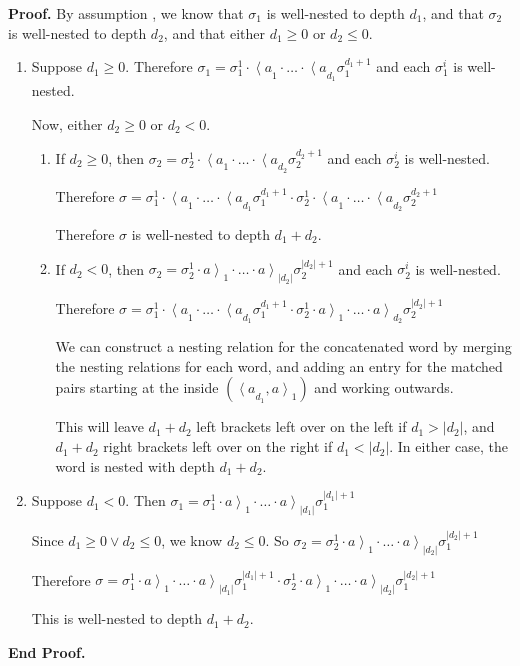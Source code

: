 \documentclass{article}
\newcommand{\lft}[1]{\left<{#1}\right.}
\newcommand{\rgt}[1]{\left.{#1}\right>}
\newenvironment{proof}{\noindent\textbf{Proof.}}
{\noindent\textbf{End Proof.}}
\begin{document}
\begin{proof}
By assumption , we know that $\sigma_1$ is well-nested to depth $d_1$, and that $\sigma_2$ is well-nested to depth $d_2$, and that either $d_1 \geq 0$ or $d_2 \leq 0$. 

  \begin{enumerate}
    \item Suppose $d_1 \geq 0$. Therefore $\sigma_1 = \sigma^1_1\cdot\lft{a}_1\cdot \ldots\cdot\lft{a}_{d_1}\sigma^{d_1+1}_1$ and each $\sigma^i_1$ is well-nested. 

      Now, either $d_2 \geq 0$ or $d_2 < 0$. 
      \begin{enumerate}
        \item If $d_2 \geq 0$, then $\sigma_2 = \sigma^1_2\cdot\lft{a}_1\cdot \ldots\cdot\lft{a}_{d_2}\sigma^{d_2+1}_2$ and each $\sigma^i_2$ is well-nested. 

          \noindent Therefore $\sigma = \sigma^1_1\cdot\lft{a}_1\cdot \ldots\cdot\lft{a}_{d_1}\sigma^{d_1+1}_1\cdot\sigma^1_2\cdot\lft{a}_1\cdot \ldots\cdot\lft{a}_{d_2}\sigma^{d_2+1}_2$
            
          \noindent Therefore $\sigma$ is well-nested to depth $d_1 + d_2$. 

        \item If $d_2 < 0$, then $\sigma_2 = \sigma^1_2\cdot\rgt{a}_1\cdot \ldots\cdot\rgt{a}_{|d_2|}\sigma^{|d_2|+1}_2$ and each $\sigma^i_2$ is well-nested. 

          \noindent Therefore $\sigma = \sigma^1_1\cdot\lft{a}_1\cdot \ldots\cdot\lft{a}_{d_1}\sigma^{d_1+1}_1\cdot\sigma^1_2\cdot\rgt{a}_1\cdot \ldots\cdot\rgt{a}_{d_2}\sigma^{|d_2|+1}_2$

          \noindent We can construct a nesting relation for the concatenated word by merging the nesting relations for each word, and adding an entry for the matched pairs starting at the inside $(\lft{a}_{d_1}, \rgt{a}_1)$ and working outwards. 
 
         \noindent This will leave $d_1 + d_2$ left brackets left over on the left if $d_1 > |d_2|$, and $d_1 + d_2$ right brackets left over on the right if $d_1 < |d_2|$. In either case, the word is nested with depth $d_1 + d_2$.         \end{enumerate}

    \item Suppose $d_1 < 0$. Then $\sigma_1 = \sigma^1_1\cdot\rgt{a}_1\cdot\ldots\cdot\rgt{a}_{|d_1|}\sigma^{|d_1| + 1}_1$
        
      \noindent Since $d_1 \geq 0 \vee d_2 \leq 0$, we know $d_2 \leq 0$. So 
           $\sigma_2 = \sigma^1_2\cdot\rgt{a}_1\cdot\ldots\cdot\rgt{a}_{|d_2|}\sigma^{|d_2| + 1}_1$

      \noindent Therefore $\sigma = \sigma^1_1\cdot\rgt{a}_1\cdot\ldots\cdot\rgt{a}_{|d_1|}\sigma^{|d_1| + 1}_1\cdot\sigma^1_2\cdot\rgt{a}_1\cdot\ldots\cdot\rgt{a}_{|d_2|}\sigma^{|d_2| + 1}_1$

      \noindent This is well-nested to depth $d_1 + d_2$. 
  \end{enumerate}
\end{proof}
\end{document}
